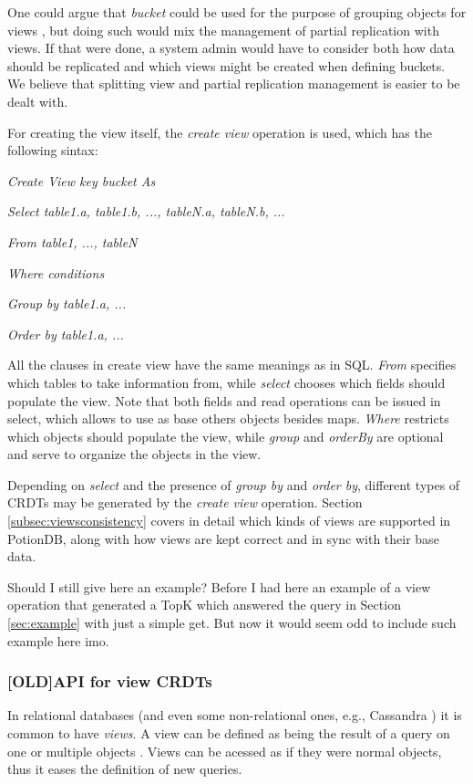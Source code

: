 \documentclass{vldb}
\newcommand{\grumbler}[2]{{\color{red}{\bf #1:} #2}}
\newcommand{\andre}[1]{\grumbler{andre}{#1}}
\newcommand{\emphvspace}{0.5\baselineskip}
\newcommand{\firstblockemph}[1]{\vspace{\emphvspace}\hspace{2em}\emph{#1}}
\newcommand{\middleblockemph}[1]{\hspace{2em}\emph{#1}}
\newcommand{\lastblockemph}[1]{\hspace{2em}\emph{#1}\vspace{\emphvspace}}
\begin{document}
One could argue that \emph{bucket} could be used for the purpose of grouping objects for views , but doing such would mix the management of partial replication with views.
If that were done, a system admin would have to consider both how data should be replicated and which views might be created when defining buckets.
We believe that splitting view and partial replication management is easier to be dealt with.

For creating the view itself, the \emph{create view} operation is used, which has the following sintax:

\firstblockemph{Create View key bucket As}

\middleblockemph{Select table1.a, table1.b, ..., tableN.a, tableN.b, ...}

\middleblockemph{From table1, ..., tableN}

\middleblockemph{Where conditions}

\middleblockemph{Group by table1.a, ...}

\lastblockemph{Order by table1.a, ...}

All the clauses in create view have the same meanings as in SQL.
\emph{From} specifies which tables to take information from, while \emph{select} chooses which fields should populate the view. 
Note that both fields and read operations can be issued in select, which allows to use as base others objects besides maps.
\emph{Where} restricts which objects should populate the view, while \emph{group} and \emph{orderBy} are optional and serve to organize the objects in the view.

Depending on \emph{select} and the presence of \emph{group by} and \emph{order by}, different types of CRDTs may be generated by the \emph{create view} operation.
Section \ref{subsec:viewsconsistency} covers in detail which kinds of views are supported in PotionDB, along with how views are kept correct and in sync with their base data.

\andre{Should I still give here an example? Before I had here an example of a view operation that generated a TopK which answered the query in Section \ref{sec:example} with just a simple get. But now it would seem odd to include such example here imo.}

\subsubsection{[OLD]API for view CRDTs}
\label{subsubsec:OLDAPIView}

In relational databases (and even some non-relational ones, e.g., Cassandra \cite{???}) it is common to have \emph{views}. 
A view can be defined as being the result of a query on one or multiple objects \cite{???}.
Views can be acessed as if they were normal objects, thus it eases the definition of new queries.
\end{document}
